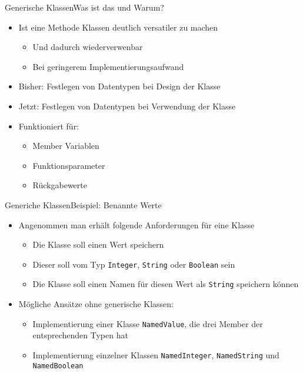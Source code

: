 \begin{frame}{Generische Klassen}{Was ist das und Warum?}
	\begin{itemize}
		\item Ist eine Methode Klassen deutlich versatiler zu machen
		\begin{itemize}
			\item Und dadurch wiederverwenbar
			\item Bei geringerem Implementierungsaufwand
		\end{itemize}
		\item Bisher: Festlegen von Datentypen bei Design der Klasse
		\item Jetzt: Festlegen von Datentypen bei Verwendung der Klasse \visible<2->{(Zumindest für einige)}
		\item Funktioniert für:
		\begin{itemize}
			\item Member Variablen
			\item Funktionsparameter
			\item Rückgabewerte
		\end{itemize}
	\end{itemize}
\end{frame}

\begin{frame}{Generiche Klassen}{Beispiel: Benannte Werte}
	\begin{itemize}
		\item Angenommen man erhält folgende Anforderungen für eine Klasse
		\begin{itemize}
			\item Die Klasse soll einen Wert speichern
            \item Dieser soll vom Typ \texttt{Integer}, \texttt{String} oder \texttt{Boolean} sein
			\item Die Klasse soll einen Namen für diesen Wert als \texttt{String} speichern können
		\end{itemize}
		\item Mögliche Ansätze ohne generische Klassen:
		\begin{itemize}
			\item Implementierung einer Klasse \texttt{NamedValue}, die drei Member der entsprechenden Typen hat
			\item Implementierung einzelner Klassen \texttt{NamedInteger}, \texttt{NamedString} und \texttt{NamedBoolean}
		\end{itemize}
	\end{itemize}
\end{frame}

